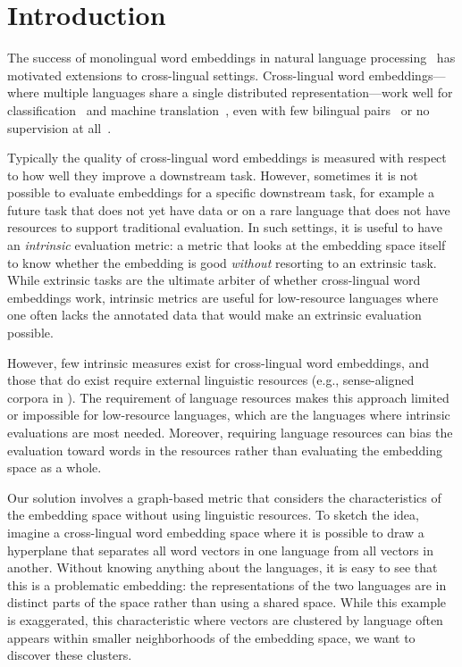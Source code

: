 \section{Introduction}

The success of monolingual word embeddings in natural language
processing~\citep{NIPS2013_5021} has motivated extensions to
cross-lingual settings.
Cross-lingual word embeddings---where multiple languages share a single
distributed representation---work well for
classification~\citep{klementiev-titov-bhattarai:2012:PAPERS,ammar2016massively}
and machine
translation~\citep{lample2018unsupervised,artetxe2018unsupervised},
even with few bilingual pairs~\citep{artetxe-labaka-agirre:2017:Long}
or no supervision at all~\cite{adv_bli,lample2018word,self_learn}.

Typically the quality of cross-lingual word embeddings is measured with respect to
how well they improve a downstream task.
However, sometimes it is not possible to evaluate embeddings for a specific downstream task,
for example a future task that does not yet have data
or on a rare language that does not have resources to support traditional evaluation.
In such settings, it is useful to have an {\em intrinsic} evaluation
metric: a metric that looks at the embedding space itself to know whether
the embedding is good \emph{without} resorting to an
extrinsic task.
While extrinsic tasks are the ultimate arbiter of
  whether cross-lingual word embeddings work, intrinsic metrics are useful for low-resource
  languages where one often lacks the annotated data that would make an
  extrinsic evaluation possible.

However, few intrinsic measures exist for cross-lingual word embeddings,
and those that do exist require external linguistic resources (e.g.,
sense-aligned corpora in \citet{ammar2016massively}).
The requirement of language resources makes this approach limited or impossible for low-resource languages,
which are the languages where intrinsic evaluations are most needed.
Moreover, requiring language resources can bias the evaluation toward words in the
resources rather than evaluating the embedding space as a whole.

Our solution involves a graph-based metric that considers the characteristics of the embedding space
without using linguistic resources.
To sketch the idea, imagine a cross-lingual word embedding space where
it is possible to draw a hyperplane that separates all word vectors in one language from all vectors in another.
Without knowing anything about the languages, it is easy to see that this is a problematic embedding:
the representations of the two languages are in distinct parts of the space rather than using a shared space.
While this example is exaggerated, this characteristic where vectors are clustered by language often appears
within smaller {neighborhoods} of the embedding space,
we want to discover these clusters.

